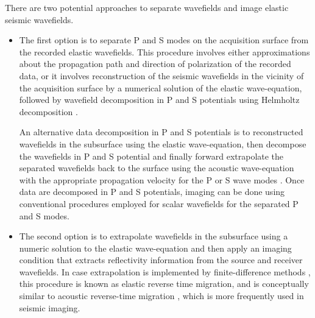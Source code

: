 There are two potential approaches to separate wavefields and image elastic seismic wavefields.
\begin{itemize}
\item
The first option is to separate P and S modes on the acquisition
surface from the recorded elastic wavefields. This procedure involves
either approximations about the propagation path and direction of
polarization of the recorded data, or it involves reconstruction of
the seismic wavefields in the vicinity of the acquisition surface by a
numerical solution of the elastic wave-equation, followed by wavefield
decomposition in P and S potentials using Helmholtz decomposition \cite[]{SEG-1988-S12.4,GEO62-02-05980613}.

An alternative data decomposition in P and S potentials is to
reconstructed wavefields in the subsurface using the elastic
wave-equation, then decompose the wavefields in P and S potential and
finally forward extrapolate the separated wavefields back to the
surface using the acoustic wave-equation with the appropriate
propagation velocity for the P or S wave modes
\cite[]{sun.elastic.rtm}. Once data are decomposed in P and S
potentials, imaging can be done using conventional procedures employed
for scalar wavefields for the separated P and S modes.

\item
The second option is to extrapolate wavefields in the subsurface using
a numeric solution to the elastic wave-equation and then apply an
imaging condition that extracts reflectivity information from the
source and receiver wavefields. In case extrapolation is implemented
by finite-difference methods
\cite[]{chang:67,chang:597}, this procedure is known
as elastic reverse time migration, and is conceptually similar to
acoustic reverse-time migration \cite[]{GEO48-11-15141524}, which is
more frequently used in seismic imaging.
\end{itemize}


